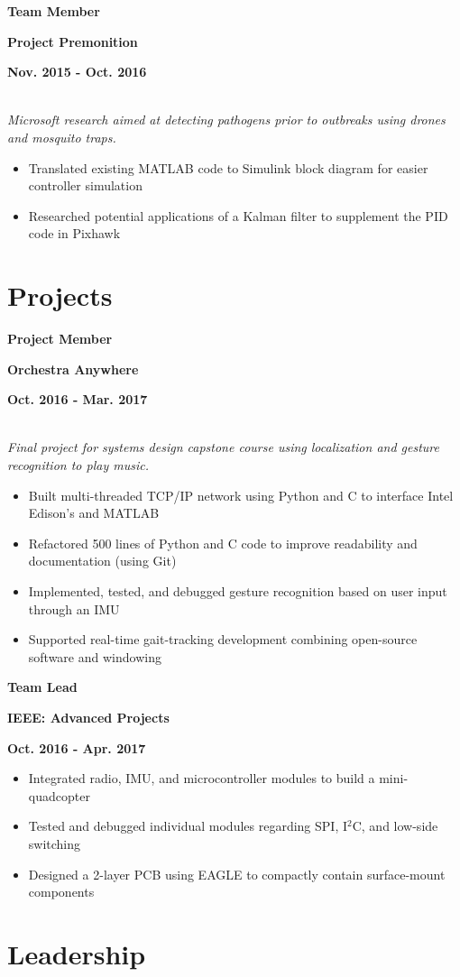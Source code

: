 \documentclass[12pt]{article}
\newcommand\textbox[1]{\parbox{.333\textwidth}{#1}}
\newcommand{\textlcr}[3]{\textbox{\textbf{#1}\hfill}\textbox{\hfil \textbf{#2}\hfil}\textbox{\hfill \textbf{#3}}}
\begin{document}
\bigskip
\textlcr{Team Member}{Project Premonition}{Nov. 2015 - Oct. 2016}
\\ \textit{Microsoft research aimed at detecting pathogens prior to outbreaks using drones and mosquito traps.}
\begin{itemize}
\item Translated existing MATLAB code to Simulink block diagram for easier controller simulation
\item Researched potential applications of a Kalman filter to supplement the PID code in Pixhawk
\end{itemize}

\section*{Projects}
\vspace*{-1em}\makebox[\linewidth]{\rule{\textwidth}{0.4pt}}

\textlcr{Project Member}{Orchestra Anywhere}{Oct. 2016 - Mar. 2017}
\\ \textit{Final project for systems design capstone course using localization and gesture recognition to play music.}
\begin{itemize}
\item Built multi-threaded TCP/IP network using Python and C to interface Intel Edison's and MATLAB
\item Refactored 500 lines of Python and C code to improve readability and documentation (using Git)
\item Implemented, tested, and debugged gesture recognition based on user input through an IMU
\item Supported real-time gait-tracking development combining open-source software and windowing
\end{itemize}

\bigskip
\textlcr{Team Lead}{IEEE: Advanced Projects}{Oct. 2016 - Apr. 2017}
\begin{itemize}
\item Integrated radio, IMU, and microcontroller modules to build a mini-quadcopter
\item Tested and debugged individual modules regarding SPI, I$^2$C, and low-side switching
\item Designed a 2-layer PCB using EAGLE to compactly contain surface-mount components
\end{itemize}

\section*{Leadership}
\vspace*{-1em}\makebox[\linewidth]{\rule{\textwidth}{0.4pt}}
\end{document}

